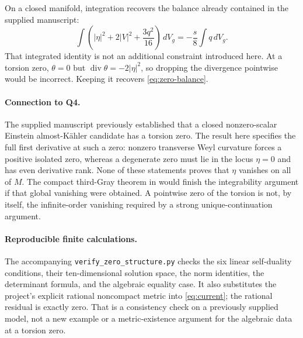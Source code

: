 \documentclass[11pt]{article}
\theoremstyle{remark}\newtheorem{remark}[theorem]{Remark}
\newcommand{\diver}{\operatorname{div}}
\newcommand{\dd}{\,dV_g}
\begin{document}
On a closed manifold, integration recovers the balance already contained
in the supplied manuscript:
\[
 \int\left(|\eta|^2+2|V|^2+\frac{3q^2}{16}\right)\dd
 =-\frac{s}{8}\int q\dd.
\]
That integrated identity is not an additional constraint introduced here.
At a torsion zero, $\theta=0$ but
$\diver\theta=-2|\eta|^2$, so dropping the divergence pointwise would be
incorrect. Keeping it recovers \eqref{eq:zero-balance}.

\paragraph{Connection to Q4.}
The supplied manuscript previously established that a closed
nonzero-scalar Einstein almost-K\"ahler candidate has a torsion zero.
The result here specifies the full first derivative at such a zero:
nonzero transverse Weyl curvature forces a positive isolated zero, whereas
a degenerate zero must lie in the locus $\eta=0$ and has even derivative
rank. None of these statements proves that $\eta$ vanishes on all of $M$.
The compact third-Gray theorem in \cite{AAD} would finish the integrability
argument if that global vanishing were obtained. A pointwise zero of the
torsion is not, by itself, the infinite-order vanishing required by a
strong unique-continuation argument.

\paragraph{Reproducible finite calculations.}
The accompanying \texttt{verify\_zero\_structure.py} checks the six linear
self-duality conditions, their ten-dimensional solution space, the norm
identities, the determinant formula, and the algebraic equality case.
It also substitutes the project's explicit rational noncompact metric
into \eqref{eq:current}; the rational residual is exactly zero. That is a
consistency check on a previously supplied model, not a new example or a
metric-existence argument for the algebraic data at a torsion zero.
\end{document}
